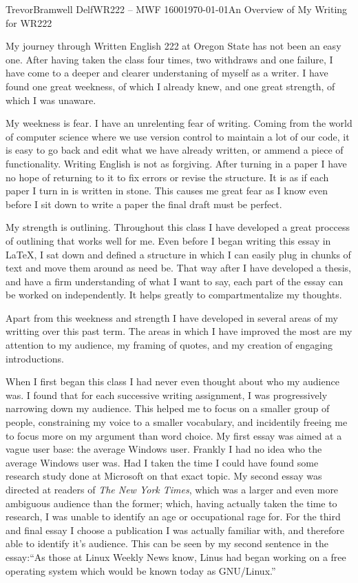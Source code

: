 \documentclass[12pt,letterpaper]{article}
\begin{document}
\begin{mla}{Trevor}{Bramwell}
{Delf}{WR222 -- MWF 1600}{\today}{An Overview of My Writing for WR222}

My journey through Written English 222 at Oregon State has not been an easy
one. After having taken the class four times, two withdraws and one failure, I
have come to a deeper and clearer understaning of myself as a writer. I have
found one great weekness, of which I already knew, and one great strength, of
which I was unaware. 

My weekness is fear. I have an unrelenting fear of
writing. Coming from the world of computer science where we use version control
to maintain a lot of our code, it is easy to go back and edit what we have
already written, or ammend a piece of functionality. Writing English is not as 
forgiving. After turning in a paper I have no hope of returning to it to fix
errors or revise the structure. It is as if each paper I turn in is written in
stone. This causes me great fear as I know even before I sit down to write a
paper the final draft must be perfect.

My strength is outlining. Throughout this class I have developed a great
proccess of outlining that works well for me. Even before I began writing this
essay in \LaTeX, I sat down and defined a structure in which I can easily
plug in chunks of text and move them around as need be. That way after I have
developed a thesis, and have a firm understanding of what I want to say, each
part of the essay can be worked on independently. It helps greatly to
compartmentalize my thoughts.

Apart from this weekness and strength I have developed in several areas of my
writting over this past term. The areas in which I have improved the most are 
my attention to my audience, my framing of quotes, and my creation of engaging
introductions.

When I first began this class I had never even thought about who my audience
was. I found that for each successive writing assignment, I was progressively
narrowing down my audience. This helped me to focus on a smaller group of
people, constraining my voice to a smaller vocabulary, and incidentily 
freeing me to focus more on my argument than word choice. My first essay was
aimed at a vague user base: the average Windows user. Frankly I had no idea
who the average Windows user was. Had I taken the time I could have found some
research study done at Microsoft on that exact topic.
My second essay was directed at readers of \emph{The New York Times}, which was
a larger and even more ambiguous audience than the former; which, having
actually taken the time to research, I was unable to identify an age or
occupational rage for.
For the third and final essay I choose a publication I was actually familiar
with, and therefore able to identify it's audience. This can be seen by my
second sentence in the essay:``As those at Linux Weekly News know, Linus had 
began working on a free 
operating system which would be known today as GNU/Linux.''


\end{mla}
\end{document}
